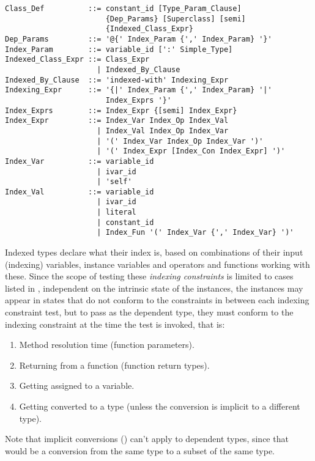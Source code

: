 \syntax\begin{lstlisting}
Class_Def          ::= constant_id [Type_Param_Clause] 
                       {Dep_Params} [Superclass] [semi] 
                       {Indexed_Class_Expr}
Dep_Params         ::= '@{' Index_Param {',' Index_Param} '}'
Index_Param        ::= variable_id [':' Simple_Type]
Indexed_Class_Expr ::= Class_Expr
                     | Indexed_By_Clause
Indexed_By_Clause  ::= 'indexed-with' Indexing_Expr
Indexing_Expr      ::= '{|' Index_Param {',' Index_Param} '|'
                       Index_Exprs '}'
Index_Exprs        ::= Index_Expr {[semi] Index_Expr}
Index_Expr         ::= Index_Var Index_Op Index_Val
                     | Index_Val Index_Op Index_Var
                     | '(' Index_Var Index_Op Index_Var ')'
                     | '(' Index_Expr [Index_Con Index_Expr] ')'
Index_Var          ::= variable_id 
                     | ivar_id
                     | 'self'
Index_Val          ::= variable_id 
                     | ivar_id 
                     | literal
                     | constant_id
                     | Index_Fun '(' Index_Var {',' Index_Var} ')'
\end{lstlisting}

Indexed types declare what their index is, based on combinations of their input (indexing) variables, instance variables and operators and functions working with these. Since the scope of testing these {\em indexing constraints} is limited to cases listed in , independent on the intrinsic state of the instances, the instances may appear in states that do not conform to the constraints in between each indexing constraint test, but to pass as the dependent type, they must conform to the indexing constraint at the time the test is invoked, that is: 
\begin{enumerate}
\item Method resolution time (function parameters). 
\item Returning from a function (function return types). 
\item Getting assigned to a variable. 
\item Getting converted to a type (unless the conversion is implicit to a different type). 
\end{enumerate}

Note that implicit conversions () can't apply to dependent types, since that would be a conversion from the same type to a subset of the same type. 

